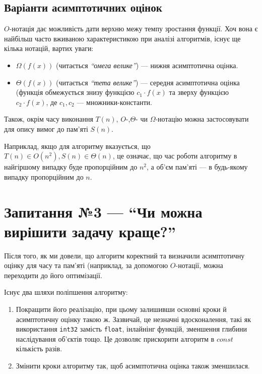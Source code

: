 \documentclass[12pt,a4paper]{report}
\begin{document}
\subsection*{Варіанти асимптотичних оцінок}

\(O\)-нотація дає можливість дати верхню межу темпу зростання функції.
Хоч вона є найбільш часто вживаною характеристикою при аналізі алгоритмів, існує ще кілька нотацій, вартих уваги:

\begin{itemize}
    \item \(\Omega(f(x))\) (читається {\itshape ``омега велике''}) --- нижня асимптотична оцінка.
    \item \(\Theta(f(x))\) (читається {\itshape ``тета велике''}) --- середня асимптотична оцінка (функція обмежується знизу функцією \(c_1 \cdot f(x)\) та зверху функцією \(c_2 \cdot f(x)\), де \(c_1, c_2\) --- множники-константи.
\end{itemize}

Також, окрім часу виконання \(T(n)\), \(O\)-,\(\Theta\)- чи \(\Omega\)-нотацію можна застосовувати для опису вимог до пам’яті \(S(n)\).

Наприклад, якщо для алгоритму вказується, що \(T(n) \in O(n^2), S(n) \in \Theta(n)\), це означає, що час роботи алгоритму в найгіршому випадку буде пропорційним до \(n^2\), а об’єм пам’яті --- в будь-якому випадку пропорційним до \(n\).



\section{Запитання №3 --- ``Чи можна вирішити задачу краще?''}

Після того, як ми довели, що алгоритм коректний та визначили асимптотичну оцінку для часу та пам’яті (наприклад, за допомогою \(O\)-нотації, можна переходити до його оптимізації.

Існує два шляхи поліпшення алгоритму:

\begin{enumerate}
    \item Покращити його реалізацію, при цьому залишивши основні кроки й асимптотичну оцінку такою ж. Зазвичай, це незначні вдосконалення, такі як використання \texttt{int32} замість \texttt{float}, інлайнінг функцій, зменшення глибини наслідування об’єктів тощо. Це дозволяє прискорити алгоритм в \(const\) кількість разів.
    \item Змінити кроки алгоритму так, щоб асимптотична оцінка також зменшилася.
\end{enumerate}
\end{document}
